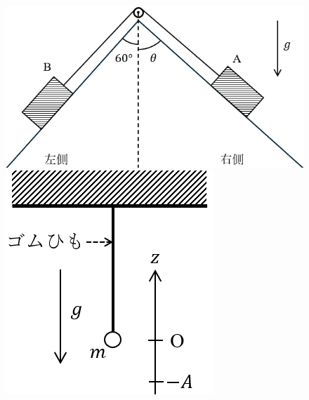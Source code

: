 \begin{figure}[H]
  \centering
  \begin{minipage}[b]{.45\columnwidth}
    \includegraphics[width=\columnwidth]{../graphs/toritsu_23_1-1.png}
    \caption{}
  \end{minipage}
  \begin{minipage}[b]{.25\columnwidth}
    \includegraphics[width=\columnwidth]{../graphs/toritsu_23_1-2.png}
    \caption{}
  \end{minipage}
  \begin{minipage}[b]{.25\columnwidth}

\end{minipage}
\end{figure}
